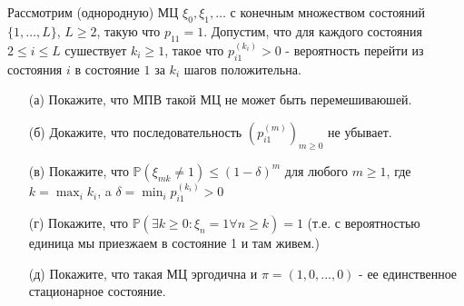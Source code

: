  
    \begin{prob}
        Рассмотрим (однородную) МЦ $\xi_{0}, \xi_{1}, \ldots$ с конечным множеством состояний $\{1, \ldots, L\}$, $L \geq 2$, такую что $p_{11}=1$. Допустим, что для каждого состояния $2 \leq i \leq L$ сушествует $k_{i} \geq 1$, такое что $p_{i 1}^{\left(k_{i}\right)}>0$ - вероятность перейти из состояния $i$ в состояние $1$ за $k_{i}$ шагов положительна.
        \begin{itemize}
        \item[(а)] Покажите, что МПВ такой МЦ не может быть перемешиваюшей.
        \item[(б)] Докажите, что последовательность $\left(p_{i 1}^{(m)}\right)_{m \geq 0}$ не убывает.
        \item[(в)] Покажите, что $\mathbb{P}\left(\xi_{m k} \neq 1\right) \leq(1-\delta)^{m}$ для любого $m \geq 1$, где $k=\max_{i} k_{i}$, a $\delta=\min_{i} p_{i 1}^{\left(k_{i}\right)}>0$
        \item[(г)] Покажите, что $\mathbb{P}\left(\exists k \geq 0: \xi_{n}=1 \forall n \geq k\right)=1$ (т.е. с вероятностью единица мы приезжаем в состояние 1 и там живем.)
        \item[(д)] Покажите, что такая МЦ эргодична и $\pi=(1,0, \ldots, 0)$ - ее единственное стационарное состояние.
        \end{itemize}
    \end{prob}
